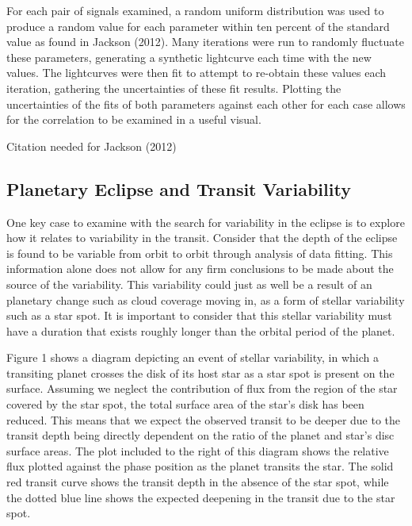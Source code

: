 \documentclass[manuscript]{aastex}
\begin{document}
    For each pair of signals examined, a random uniform distribution was used to produce a random value for each parameter within ten percent of the standard value as found in Jackson (2012). Many iterations were run to randomly fluctuate these parameters, generating a synthetic lightcurve each time with the new values. The lightcurves were then fit to attempt to re-obtain these values each iteration, gathering the uncertainties of these fit results. Plotting the uncertainties of the fits of both parameters against each other for each case allows for the correlation to be examined in a useful visual. 

Citation needed for Jackson (2012)

\subsection{Planetary Eclipse and Transit Variability} 

	One key case to examine with the search for variability in the eclipse is to explore how it relates to variability in the transit. Consider that the depth of the eclipse is found to be variable from orbit to orbit through analysis of data fitting. This information alone does not allow for any firm conclusions to be made about the source of the variability. This variability could just as well be a result of an planetary change such as cloud coverage moving in, as a form of stellar variability such as a star spot. It is important to consider that this stellar variability must have a duration that exists roughly longer than the orbital period of the planet.

	Figure 1 shows a diagram depicting an event of stellar variability, in which a transiting planet crosses the disk of its host star as a star spot is present on the surface. Assuming we neglect the contribution of flux from the region of the star covered by the star spot, the total surface area of the star's disk has been reduced. This means that we expect the observed transit to be deeper due to the transit depth being directly dependent on the ratio of the planet and star's disc surface areas. The plot included to the right of this diagram shows the relative flux plotted against the phase position as the planet transits the star. The solid red transit curve shows the transit depth in the absence of the star spot, while the dotted blue line shows the expected deepening in the transit due to the star spot.
    
\end{document}
